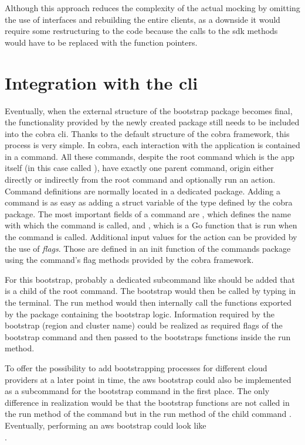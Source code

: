Although this approach reduces the complexity of the actual mocking by omitting the use of interfaces and rebuilding the entire clients, as a downside it would require some restructuring to the code because the calls to the \ac{sdk} methods would have to be replaced with the function pointers.

\section{Integration with the \ac{cli}}
Eventually, when the external structure of the bootstrap package becomes final, the functionality provided by the newly created package still needs to be included into the cobra \ac{cli}.
Thanks to the default structure of the cobra framework, this process is very simple.
In cobra, each interaction with the application is contained in a command.
All these commands, despite the root command which is the app itself (in this case called ), have exactly one parent command, origin either directly or indirectly from the root command and optionally run an action.
Command definitions are normally located in a dedicated package.
Adding a command is as easy as adding a struct variable of the type  defined by the cobra package.
The most important fields of a command are , which defines the name with which the command is called, and , which is a Go function that is run when the command is called.
Additional input values for the action can be provided by the use of \emph{flags}.
Those are defined in an init function of the commands package using the command's flag methods provided by the cobra framework.

For this bootstrap, probably a dedicated subcommand like  should be added that is a child of the root command.
The bootstrap would then be called by typing  in the terminal.
The run method would then internally call the functions exported by the package containing the bootstrap logic.
Information required by the bootstrap (region and cluster name) could be realized as required flags of the bootstrap command and then passed to the bootstraps functions inside the run method.

To offer the possibility to add bootstrapping processes for different cloud providers at a later point in time, the \ac{aws} bootstrap could also be implemented as a subcommand for the bootstrap command in the first place.
The only difference in realization would be that the bootstrap functions are not called in the run method of the  command but in the run method of the child command .
Eventually, performing an \ac{aws} bootstrap could look like\\
.